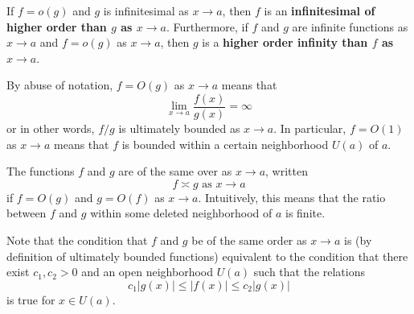     \begin{definition}
      If $f = o(g)$ and $g$ is infinitesimal as $x \rightarrow a$, then $f$ is an \textbf{infinitesimal of higher order than $g$ as $x \rightarrow a$}. Furthermore, if $f$ and $g$ are infinite functions as $x\rightarrow a$ and $f = o(g)$ as $x \rightarrow a$, then $g$ is a \textbf{higher order infinity than $f$ as $x \rightarrow a$}. 
    \end{definition}

    \begin{definition}
      By abuse of notation, $f = O(g)$ as $x \rightarrow a$ means that 
      \begin{equation}
        \lim_{x \rightarrow a} \frac{f(x)}{g(x)} = \infty
      \end{equation}
      or in other words, $f/g$ is ultimately bounded as $x \rightarrow a$. In particular, $f = O(1)$ as $x \rightarrow a$ means that $f$ is bounded within a certain neighborhood $U(a)$ of $a$. 
    \end{definition}

    \begin{definition}
      The functions $f$ and $g$ are of the same over as $x \rightarrow a$, written 
      \begin{equation}
        f \asymp g \text{ as } x \rightarrow a
      \end{equation}
      if $f = O(g)$ and $g = O(f)$ as $x \rightarrow a$. Intuitively, this means that the ratio between $f$ and $g$ within some deleted neighborhood of $a$ is finite. 

      Note that the condition that $f$ and $g$ be of the same order as $x \rightarrow a$ is (by definition of ultimately bounded functions) equivalent to the condition that there exist $c_1, c_2 > 0$ and an open neighborhood $U (a)$ such that the relations
      \begin{equation}
        c_1 |g(x)| \leq |f(x)| \leq c_2 |g(x)|
      \end{equation}
      is true for $x \in U(a)$. 
    \end{definition}

